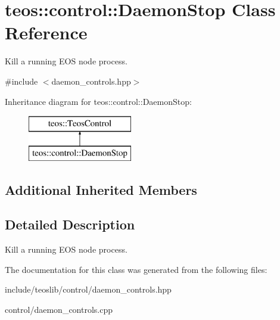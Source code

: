 \hypertarget{classteos_1_1control_1_1_daemon_stop}{}\section{teos\+:\+:control\+:\+:Daemon\+Stop Class Reference}
\label{classteos_1_1control_1_1_daemon_stop}


Kill a running E\+OS node process.  




{\ttfamily \#include $<$daemon\+\_\+controls.\+hpp$>$}

Inheritance diagram for teos\+:\+:control\+:\+:Daemon\+Stop\+:\begin{figure}[H]
\begin{center}
\leavevmode
\includegraphics[height=2.000000cm]{classteos_1_1control_1_1_daemon_stop}
\end{center}
\end{figure}
\subsection*{Additional Inherited Members}


\subsection{Detailed Description}
Kill a running E\+OS node process. 

The documentation for this class was generated from the following files\+:\begin{DoxyCompactItemize}
\item 
include/teoslib/control/daemon\+\_\+controls.\+hpp\item 
control/daemon\+\_\+controls.\+cpp\end{DoxyCompactItemize}
